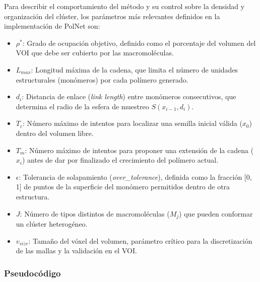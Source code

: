 Para describir el comportamiento del método y su control sobre la densidad y organización del clúster, los parámetros más relevantes definidos en la implementación de PolNet son:

\begin{itemize}
    \item $\rho^*$: Grado de ocupación objetivo, definido como el porcentaje del volumen del VOI que debe ser cubierto por las macromoléculas.
    \item $L_{max}$: Longitud máxima de la cadena, que limita el número de unidades estructurales (monómeros) por cada polímero generado.
    \item $d_i$: Distancia de enlace (\textit{link length}) entre monómeros consecutivos, que determina el radio de la esfera de muestreo $S(x_{i-1}, d_i)$.
    \item $T_c$: Número máximo de intentos para localizar una semilla inicial válida ($x_0$) dentro del volumen libre.
    \item $T_m$: Número máximo de intentos para proponer una extensión de la cadena ($x_i$) antes de dar por finalizado el crecimiento del polímero actual.
    \item $\epsilon$: Tolerancia de solapamiento (\textit{over\_tolerance}), definida como la fracción [0, 1] de puntos de la superficie del monómero permitidos dentro de otra estructura.
    \item $J$: Número de tipos distintos de macromoléculas ($M_j$) que pueden conformar un clúster heterogéneo.
    \item $v_{size}$: Tamaño del vóxel del volumen, parámetro crítico para la discretización de las mallas y la validación en el VOI.
\end{itemize}

\subsubsection{Pseudocódigo}


